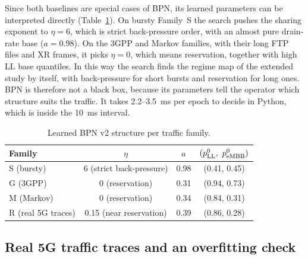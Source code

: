 Since both baselines are special cases of BPN, its learned parameters can be interpreted directly (Table~\ref{tab:b3-theta}). On bursty Family~S the search pushes the sharing exponent to $\eta = 6$, which is strict back-pressure order, with an almost pure drain-rate base ($a = 0.98$). On the 3GPP and Markov families, with their long FTP files and XR frames, it picks $\eta = 0$, which means reservation, together with high LL base quantiles. In this way the search finds the regime map of the extended study by itself, with back-pressure for short bursts and reservation for long ones. BPN is therefore not a black box, because its parameters tell the operator which structure suits the traffic. It takes 2.2--3.5~ms per epoch to decide in Python, which is inside the 10~ms interval.

\begin{table}[H]
\caption{Learned BPN v2 structure per traffic family.}
\label{tab:b3-theta}
\centering
\begin{tabular}{lccc}
\toprule
Family & $\eta$ & $a$ & $(p^0_{\rm LL},\ p^0_{\rm eMBB})$ \\
\midrule
S (bursty) & 6 (strict back-pressure) & 0.98 & (0.41, 0.45) \\
G (3GPP) & 0 (reservation) & 0.31 & (0.94, 0.73) \\
M (Markov) & 0 (reservation) & 0.34 & (0.84, 0.31) \\
R (real 5G traces) & 0.15 (near reservation) & 0.39 & (0.86, 0.28) \\
\bottomrule
\end{tabular}
\end{table}

\subsection{Real 5G traffic traces and an overfitting check}
\label{sec:rb-real}

